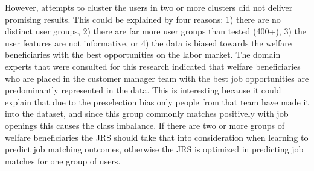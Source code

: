 However, attempts to cluster the users in two or more clusters did not deliver promising results.
This could be explained by four reasons: 1) there are no distinct user groups, 2) there are far more user groups than tested (400+), 3) the user features are not informative, or 4) the data is biased towards the welfare beneficiaries with the best opportunities on the labor market.
The domain experts that were consulted for this research indicated that welfare beneficiaries who are placed in the customer manager team with the best job opportunities are predominantly represented in the data.  
This is interesting because it could explain that due to the preselection bias only people from that team have made it into the dataset, and since this group commonly matches positively with job openings this causes the class imbalance.
If there are two or more groups of welfare beneficiaries the JRS should take that into consideration when learning to predict job matching outcomes, otherwise the JRS is optimized in predicting job matches for one group of users. 

